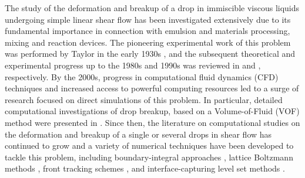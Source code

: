 \documentclass[%
 reprint,
 showkeys,
 amsmath,amssymb,
 aps,
 prfluids,
 onecolumn
]{revtex4-2}
\begin{document}
%
%
The study of the deformation and breakup of a drop in immiscible viscous
liquids undergoing simple linear shear flow has been investigated extensively
due to its fundamental importance in connection with emulsion and materials
processing, mixing and reaction devices. The pioneering experimental work
of this problem was performed by Taylor in the early 1930s \cite{Tay32, Tay34},
and the subsequent theoretical and experimental progress up to the 1980s and
1990s was reviewed in \cite{Ral84} and \cite{Sto94}, respectively.  By the
2000s, progress in computational fluid dynamics (CFD) techniques and increased
access to powerful computing resources led to a surge of research focused on
direct simulations of this problem.  In particular, detailed computational
investigations of drop breakup, 
based on a Volume-of-Fluid (VOF) method \cite{HirNic81} were
presented in \cite{LiRenRen00, RenCri01-1, RenCri01-2, RenCriLi02,KhiRenCri03,Ren06,Ren07,Ren08-2}.  
Since then, the literature on computational
studies on the deformation and breakup of a single or several drops in shear
flow has continued to grow \cite{CriGuiAlfBlaLoe03, InaTomOgi03,ZhaMikBan06,
BazAndMei06, JanAnd08, CroGriSch10,KomShaEskDer14,KomShaEskDer15, IoaLiuZha16,
HerRan17,AmaBalCasOli19, ZhaShuGuaYan21} and a variety of numerical techniques
have been developed to tackle this problem, including boundary-integral
approaches \cite{CriBlaLoe01, JanAnd07}, lattice Boltzmann methods \cite{Ina06,
KomShaEskDer14}, front tracking schemes \cite{UnvTry92}, and 
{\color{red} interface-capturing }
level set methods \cite{SusSmeOsh94}.  
\end{document}
